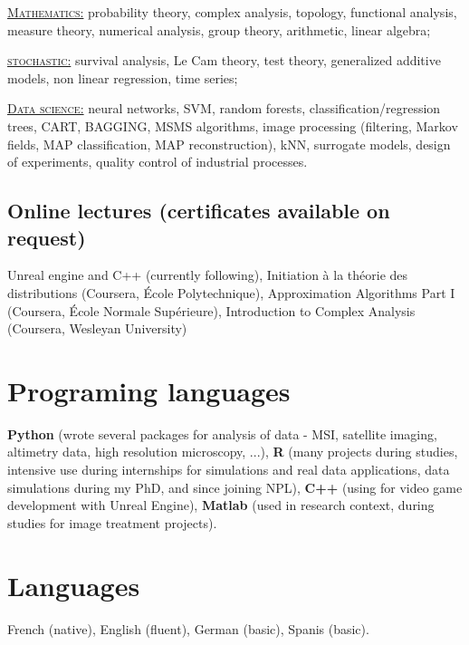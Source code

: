 \documentclass[11pt,a4paper,sans]{moderncv} %
\begin{document}
\begin{multicols}{2}
\underline{\textsc{Mathematics:}}
probability theory, complex analysis, topology, functional analysis, measure theory, numerical analysis, group theory, arithmetic, linear algebra;

\underline{\textsc{stochastic:}}
survival analysis, Le Cam theory, test theory, generalized additive models, non linear regression, time series;

\underline{\textsc{Data science:}} neural networks, SVM, random forests, classification/regression trees, CART, BAGGING, MSMS algorithms, image processing (filtering, Markov fields, MAP classification, MAP reconstruction), kNN, surrogate models, design of experiments, quality control of industrial processes.
\end{multicols}

\medskip

\subsection{Online lectures (certificates available on request)}
Unreal engine and C++ (currently following), Initiation \`a la th\'eorie des distributions (Coursera, \'Ecole Polytechnique), Approximation Algorithms Part I (Coursera, \'Ecole Normale Sup\'erieure), Introduction to Complex Analysis (Coursera, Wesleyan University)

\section{Programing languages}
\textbf{Python} (wrote several packages for analysis of data - MSI, satellite imaging, altimetry data, high resolution microscopy, ...), \textbf{R} (many projects during studies, intensive use during internships for simulations and real data applications, data simulations during my PhD, and since joining NPL), \textbf{C++} (using for video game development with Unreal Engine), \textbf{Matlab} (used in research context, during studies for image treatment projects).


\section{Languages}
French (native), English (fluent), German (basic), Spanis (basic).
\end{document}
